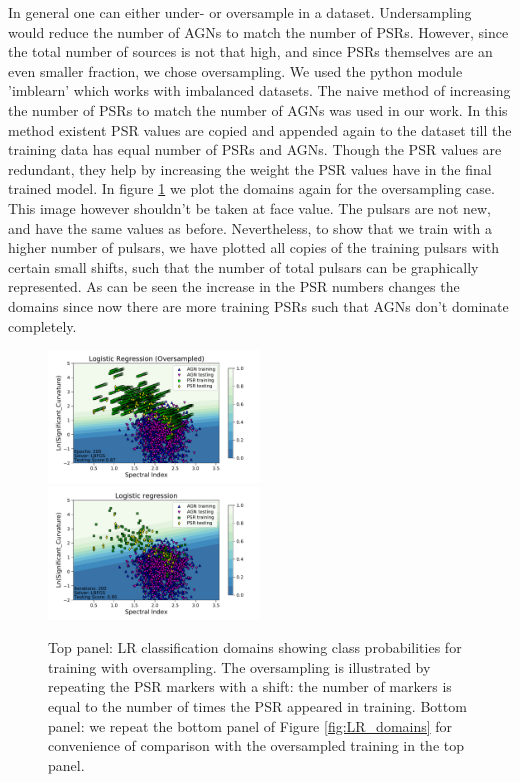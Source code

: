 In general one can either under- or oversample in a dataset. Undersampling would reduce the number of AGNs to match the number of PSRs. However, since the total number of sources is not that high, and since PSRs themselves are an even smaller fraction, we chose oversampling. We used the python module 'imblearn' which works with imbalanced datasets. The naive method of increasing the number of PSRs to match the number of AGNs was used in our work. In this method existent PSR values are copied and appended again to the dataset till the training data has equal number of PSRs and AGNs. Though the PSR values are redundant, they help by increasing the weight the PSR values have in the final trained model. In figure \ref{fig:LR_domains_O} we plot the domains again for the oversampling case. This image however shouldn't be taken at face value. The pulsars are not new, and have the same values as before. Nevertheless, to show that we train with a higher number of pulsars, we have plotted all copies of the training pulsars with certain small shifts, such that the number of total pulsars can be graphically represented. As can be seen the increase in the PSR numbers changes the domains since now there are more training PSRs such that AGNs don't dominate completely.

\begin{figure}[h]
\includegraphics[width=0.5\textwidth]{plots/classification_domains/lr_200_lbfgs_oversample.pdf}
\includegraphics[width=0.5\textwidth]{plots/classification_domains/lr_200_lbfgs.pdf}
\caption{Top panel: LR classification domains showing class probabilities for training with oversampling.
The oversampling is illustrated by repeating the PSR markers with a shift: the number of markers is equal to the number of times the PSR appeared in training.
Bottom panel: we repeat the bottom panel of Figure \ref{fig:LR_domains} for convenience of comparison with the oversampled training in the top panel.
}  
\label{fig:LR_domains_O}
\end{figure}
